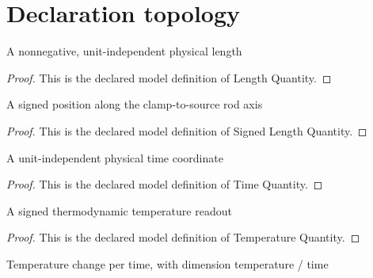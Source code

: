 \section{Declaration topology}
\begin{definition}
  \label{def:physics:phyx-mini-0156:phyxminiproblems-problemphyxmini0156-lengthquantity}
  A nonnegative, unit-independent physical length
\end{definition}
\begin{proof}
  This is the declared model definition of Length Quantity.
\end{proof}
\begin{definition}
  \label{def:physics:phyx-mini-0156:phyxminiproblems-problemphyxmini0156-signedlengthquantity}
  A signed position along the clamp-to-source rod axis
\end{definition}
\begin{proof}
  This is the declared model definition of Signed Length Quantity.
\end{proof}
\begin{definition}
  \label{def:physics:phyx-mini-0156:phyxminiproblems-problemphyxmini0156-timequantity}
  A unit-independent physical time coordinate
\end{definition}
\begin{proof}
  This is the declared model definition of Time Quantity.
\end{proof}
\begin{definition}
  \label{def:physics:phyx-mini-0156:phyxminiproblems-problemphyxmini0156-temperaturequantity}
  A signed thermodynamic temperature readout
\end{definition}
\begin{proof}
  This is the declared model definition of Temperature Quantity.
\end{proof}
\begin{definition}
  \label{def:physics:phyx-mini-0156:phyxminiproblems-problemphyxmini0156-temperatureratequantity}
  Temperature change per time, with dimension temperature / time
\end{definition}
